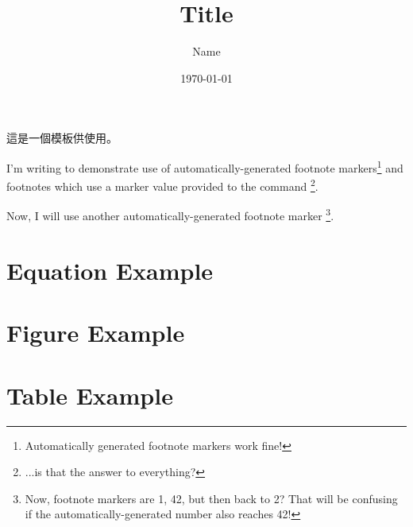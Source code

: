 \documentclass[a4paper]{article}
\title{Title}
\author{Name}
\date{\today}
\begin{document}





這是一個模板供使用。

I'm writing to demonstrate use of automatically-generated footnote markers\footnote{Automatically generated footnote markers work fine!} and footnotes which use a marker value provided to the command
\footnote[42]{...is that the answer to everything?}.

Now, I will use another automatically-generated footnote marker
\footnote{Now, footnote markers are 1, 42, but then back to 2? That will be confusing if the automatically-generated number also reaches 42!}.

\section{Equation Example}



\section{Figure Example}




\section{Table Example}


\end{document}
